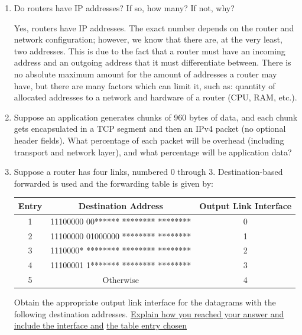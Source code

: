 \begin{enumerate}

  \item Do routers have IP addresses? If so, how many? If not, why?

    Yes, routers have IP addresses. The exact number depends on the router and network configuration; however, we know that there are, at the very least, two addresses. This is due to the fact that a router must have an incoming address and an outgoing address that it must differentiate between. There is no absolute maximum amount for the amount of addresses a router may have, but there are many factors which can limit it, such as: quantity of allocated addresses to a network and hardware of a router (CPU, RAM, etc.).

  \item Suppose an application generates chunks of 960 bytes of data, and each chunk gets encapsulated in a TCP segment and then an IPv4 packet (no optional header fields). What percentage of each packet will be overhead (including transport and network layer), and what percentage will be application data?

  \item Suppose a router has four links, numbered 0 through 3. Destination-based forwarded is used and the forwarding table is given by:

    \begin{center}
      \begin{tabular}[h!]{|c|c|c|}
        \hline
        Entry & Destination Address & Output Link Interface\\
        \hline
        1 & 11100000 00****** ******** ******** & 0\\
        \hline
        2 & 11100000 01000000 ******** ******** & 1\\
        \hline
        3 & 1110000* ******** ******** ******** & 2\\
        \hline
        4 & 11100001 1******* ******** ******** & 3\\
        \hline
        5 & Otherwise & 4\\
        \hline
      \end{tabular}
    \end{center}

  Obtain the appropriate output link interface for the datagrams with the following destination addresses. \underline{Explain how you reached your answer and include the interface and} \underline{the table entry chosen}


\end{enumerate}
